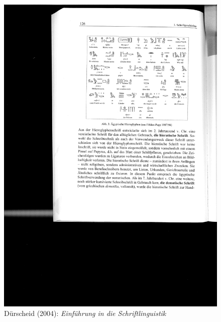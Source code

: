 \begin{frame}
\begin{minipage}{.48\textwidth}
	\begin{figure}
	\centering
	\includegraphics{material/04Hieroglyphen.pdf}
	\caption[Hiero]{Dürscheid (2004): \textit{Einführung in die Schriftlinguistik}}
	\end{figure}
	\end{minipage}
		
\end{frame}



